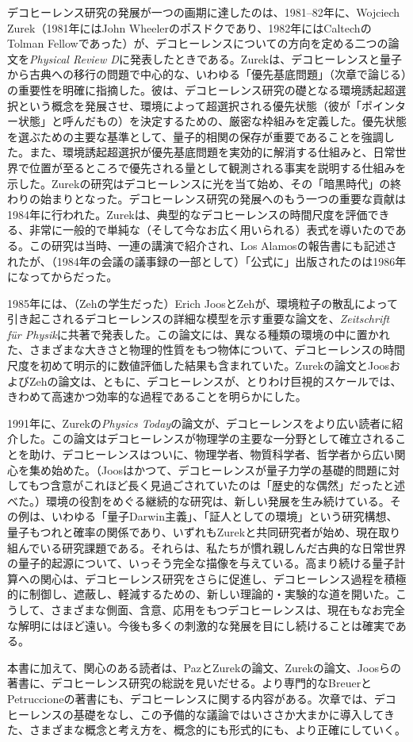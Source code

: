 \hypertarget{srcpage:11}{}\label{srcpage:11}デコヒーレンス研究の発展が一つの画期に達したのは、1981--82年に、Wojciech Zurek（1981年にはJohn Wheelerのポスドクであり、1982年にはCaltechのTolman Fellowであった）が、デコヒーレンスについての方向を定める二つの論文を\textit{Physical Review D}に発表したときである\cite{ref008,ref009}。Zurekは、デコヒーレンスと量子から古典への移行の問題で中心的な、いわゆる「優先基底問題」（次章で論じる）の重要性を明確に指摘した。彼は、デコヒーレンス研究の礎となる環境誘起超選択という概念を発展させ、環境によって超選択される優先状態（彼が「ポインター状態」と呼んだもの）を決定するための、厳密な枠組みを定義した。優先状態を選ぶための主要な基準として、量子的相関の保存が重要であることを強調した。また、環境誘起超選択が優先基底問題を実効的に解消する仕組みと、日常世界で位置が至るところで優先される量として観測される事実を説明する仕組みを示した。Zurekの研究はデコヒーレンスに光を当て始め、その「暗黒時代」の終わりの始まりとなった。デコヒーレンス研究の発展へのもう一つの重要な貢献は1984年に行われた。Zurekは、典型的なデコヒーレンスの時間尺度を評価できる、非常に一般的で単純な（そして今なお広く用いられる）表式を導いたのである\cite{ref012}。この研究は当時、一連の講演で紹介され、Los Alamosの報告書にも記述されたが、（1984年の会議の議事録の一部として）「公式に」出版されたのは1986年になってからだった。

1985年には、（Zehの学生だった）Erich JoosとZehが、環境粒子の散乱によって引き起こされるデコヒーレンスの詳細な模型を示す重要な論文を、\textit{Zeitschrift für Physik}に共著で発表した\cite{ref007}。この論文には、異なる種類の環境の中に置かれた、さまざまな大きさと物理的性質をもつ物体について、デコヒーレンスの時間尺度を初めて明示的に数値評価した結果も含まれていた。Zurekの論文とJoosおよびZehの論文は、ともに、デコヒーレンスが、とりわけ巨視的スケールでは、きわめて高速かつ効率的な過程であることを明らかにした。

1991年に、Zurekの\textit{Physics Today}の論文\cite{ref013}が、デコヒーレンスをより広い読者に紹介した。この論文はデコヒーレンスが物理学の主要な一分野として確立されることを助け、デコヒーレンスはついに、物理学者、物質科学者、哲学者から広い関心を集め始めた。（Joosはかつて、デコヒーレンスが量子力学の基礎的問題に対してもつ含意がこれほど長く見過ごされていたのは「歴史的な偶然」だったと述べた\cite[p.~13]{ref014}。）環境の役割をめぐる継続的な研究は、新しい発展を生み続けている。その例は、いわゆる「量子Darwin主義」、「証人としての環境」という研究構想、量子もつれと確率の関係であり、いずれもZurekと共同研究者が始め、現在取り組んでいる研究課題である。それらは、私たちが慣れ親しんだ古典的な日常世界の量子的起源について、いっそう完全な描像を与えている。\hypertarget{srcpage:12}{}\label{srcpage:12}高まり続ける量子計算への関心は、デコヒーレンス研究をさらに促進し、デコヒーレンス過程を積極的に制御し、遮蔽し、軽減するための、新しい理論的・実験的な道を開いた。こうして、さまざまな側面、含意、応用をもつデコヒーレンスは、現在もなお完全な解明にはほど遠い。今後も多くの刺激的な発展を目にし続けることは確実である。

本書に加えて、関心のある読者は、PazとZurekの論文\cite{ref015}、Zurekの論文\cite{ref016}、Joosらの著書\cite{ref017}に、デコヒーレンス研究の総説を見いだせる。より専門的なBreuerとPetruccioneの著書\cite{ref018}にも、デコヒーレンスに関する内容がある。次章では、デコヒーレンスの基礎をなし、この予備的な議論ではいささか大まかに導入してきた、さまざまな概念と考え方を、概念的にも形式的にも、より正確にしていく。
